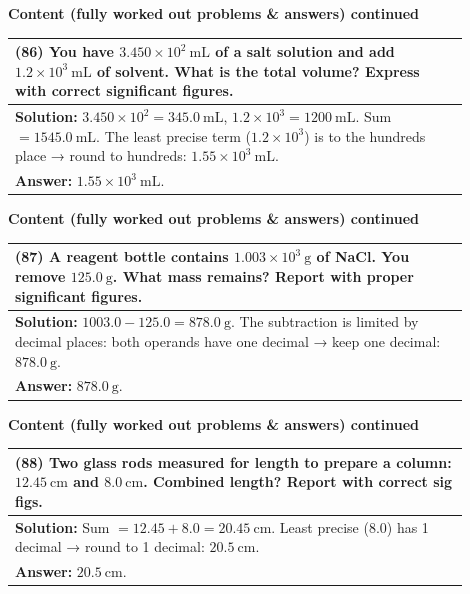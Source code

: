 \documentclass{article}
\begin{document}
\noindent
{\large \textbf{Content (fully worked out problems \& answers) continued}} \\[0.2em]
\begin{tabular}{|p{0.9\linewidth}|}
\hline
\vspace{0.2cm}
\textbf{(86)} You have $3.450\times10^{2}~\text{mL}$ of a salt solution and add $1.2\times10^{3}~\text{mL}$ of solvent. What is the total volume? Express with correct significant figures. \\
\hline
\vspace{0.2cm}
\textbf{Solution:} $3.450\times10^{2}=345.0~\text{mL}$, $1.2\times10^{3}=1200~\text{mL}$. Sum $=1545.0~\text{mL}$. The least precise term ($1.2\times10^{3}$) is to the hundreds place → round to hundreds: $1.55\times10^{3}~\text{mL}$. \\
\textbf{Answer:} $1.55\times10^{3}~\text{mL}$. \\
\hline
\end{tabular}
\newpage

\noindent
{\large \textbf{Content (fully worked out problems \& answers) continued}} \\[0.2em]
\begin{tabular}{|p{0.9\linewidth}|}
\hline
\vspace{0.2cm}
\textbf{(87)} A reagent bottle contains $1.003\times10^{3}~\text{g}$ of NaCl. You remove $125.0~\text{g}$. What mass remains? Report with proper significant figures. \\
\hline
\vspace{0.2cm}
\textbf{Solution:} $1003.0-125.0=878.0~\text{g}$. The subtraction is limited by decimal places: both operands have one decimal → keep one decimal: $878.0~\text{g}$. \\
\textbf{Answer:} $878.0~\text{g}$. \\
\hline
\end{tabular}
\newpage

\noindent
{\large \textbf{Content (fully worked out problems \& answers) continued}} \\[0.2em]
\begin{tabular}{|p{0.9\linewidth}|}
\hline
\vspace{0.2cm}
\textbf{(88)} Two glass rods measured for length to prepare a column: $12.45~\text{cm}$ and $8.0~\text{cm}$. Combined length? Report with correct sig figs. \\
\hline
\vspace{0.2cm}
\textbf{Solution:} Sum $=12.45+8.0=20.45~\text{cm}$. Least precise (8.0) has 1 decimal → round to 1 decimal: $20.5~\text{cm}$. \\
\textbf{Answer:} $20.5~\text{cm}$. \\
\hline
\end{tabular}
\newpage
\end{document}

